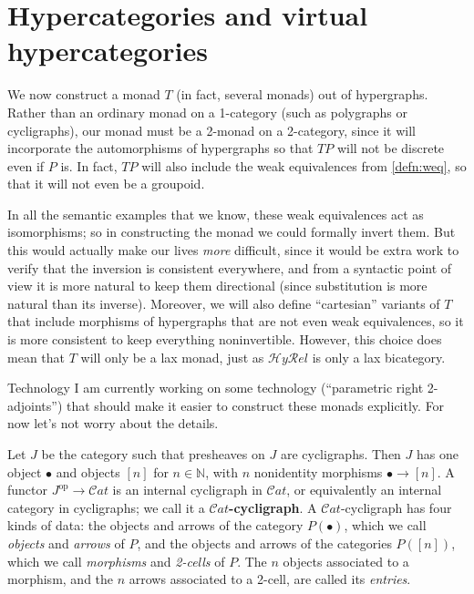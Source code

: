 \documentclass{article}
\theoremstyle{definition}
\theoremstyle{remark}
\def\Cat{\ensuremath{\mathcal{C}\mathit{at}}}
\def\op{^{\mathrm{op}}}
\def\N{\mathbb{N}}
\def\hyrel{\mathcal{H}\mathit{y}\mathcal{R}\mathit{el}}
\begin{document}
\section{Hypercategories and virtual hypercategories}
\label{sec:hypercats}

We now construct a monad $T$ (in fact, several monads) out of hypergraphs.
Rather than an ordinary monad on a 1-category (such as polygraphs or cycligraphs), our monad must be a 2-monad on a 2-category, since it will incorporate the automorphisms of hypergraphs so that $T P$ will not be discrete even if $P$ is.
In fact, $T P$ will also include the weak equivalences from \cref{defn:weq}, so that it will not even be a groupoid.

In all the semantic examples that we know, these weak equivalences act as isomorphisms; so in constructing the monad we could formally invert them.
But this would actually make our lives \emph{more} difficult, since it would be extra work to verify that the inversion is consistent everywhere, and from a syntactic point of view it is more natural to keep them directional (since substitution is more natural than its inverse).
Moreover, we will also define ``cartesian'' variants of $T$ that include morphisms of hypergraphs that are not even weak equivalences, so it is more consistent to keep everything noninvertible.
However, this choice does mean that $T$ will only be a lax monad, just as $\hyrel$ is only a lax bicategory.

\begin{anfxnote}{Technology}
  I am currently working on some technology (``parametric right 2-adjoints'') that should make it easier to construct these monads explicitly.
  For now let's not worry about the details.
\end{anfxnote}

Let $J$ be the category such that presheaves on $J$ are cycligraphs.
Then $J$ has one object $\bullet$ and objects $[n]$ for $n\in\N$, with $n$ nonidentity morphisms $\bullet\to [n]$.
A functor $J\op\to\Cat$ is an internal cycligraph in \Cat, or equivalently an internal category in cycligraphs; we call it a \textbf{\Cat-cycligraph}.
A \Cat-cycligraph has four kinds of data: the objects and arrows of the category $P(\bullet)$, which we call \emph{objects} and \emph{arrows} of $P$, and the objects and arrows of the categories $P([n])$, which we call \emph{morphisms} and \emph{2-cells} of $P$.
The $n$ objects associated to a morphism, and the $n$ arrows associated to a 2-cell, are called its \emph{entries}.
\end{document}
